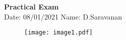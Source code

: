 \documentclass[a4paper,10pt,openright]{report}
\begin{document}
\singlespacing
\pagestyle{plain}

\begin{small}
\begin{center}
\textbf{Practical Exam} \\
Date: 08/01/2021 \hspace{2mm} Name: D.Saravanan
\end{center}
\end{small}

\vspace{10px}





\begin{figure}[ht!]
\texttt{[image: image1.pdf]}
\centering
\end{figure}


\end{document}
